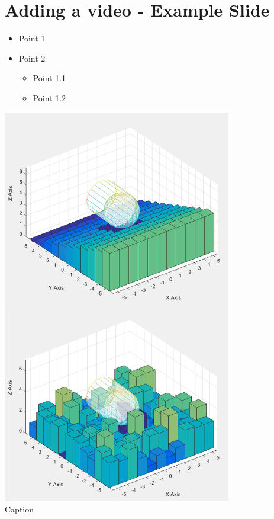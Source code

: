 \documentclass[%
    fourtothree=true, %
    DepLogo=true     %
    ]{ETHpres}
\begin{document}
\section*{Adding a video - Example Slide}
\begin{minipage}{0.6\textwidth}
	\begin{itemize}
		\item[\ETHitem] Point 1
		\item[\ETHitem] Point 2
		\begin{itemize}
			\item Point 1.1
			\item Point 1.2
		\end{itemize}
\end{itemize}
\end{minipage}
\begin{minipage}{0.39\textwidth}
	\centering
	\includegraphics[width=0.75\textwidth]{SlopeStdDev.png}\\
	\footnotesize{Caption}
\end{minipage}
\end{document}
